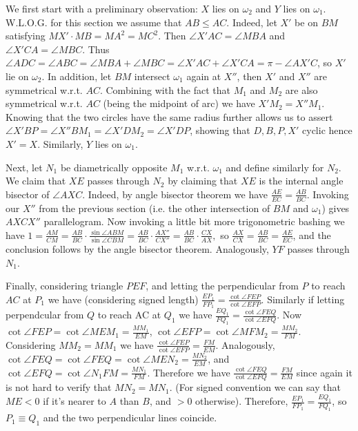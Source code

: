 \documentclass[11pt,a4paper]{article}
\begin{document}
\begin{itemize}
We first start with a preliminary observation: $X$ lies on $\omega_2$ and $Y$ lies on $\omega_1$. W.L.O.G. for this section we assume that $AB\le AC$. Indeed, let $X'$ be on $BM$ satisfying $MX'\cdot MB=MA^2=MC^2$. Then $\angle X'AC=\angle MBA$ and $\angle X'CA=\angle MBC$. Thus $\angle ADC=\angle ABC=\angle MBA+\angle MBC=\angle X'AC+\angle X'CA=\pi - \angle AX'C$, so $X'$ lie on $\omega_2$. In addition, let $BM$ intersect $\omega_1$ again at $X''$, then $X'$ and $X''$ are symmetrical w.r.t. $AC$. Combining with the fact that $M_1$ and $M_2$ are also symmetrical w.r.t. $AC$ (being the midpoint of arc) we have $X'M_2=X''M_1$. Knowing that the two circles have the same radius further allows us to assert $\angle X'BP=\angle X''BM_1=\angle X'DM_2=\angle X'DP$, showing that $D, B, P, X'$ cyclic hence $X'=X$. Similarly, $Y$ lies on $\omega_1$.

Next, let $N_1$ be diametrically opposite $M_1$ w.r.t. $\omega_1$ and define similarly for $N_2$. We claim that $XE$ passes through $N_2$ by claiming that $XE$ is the internal angle bisector of $\angle AXC$. Indeed, by angle bisector theorem we have $\frac{AE}{EC}=\frac{AB}{BC}$. Invoking our $X''$ from the previous section (i.e. the other intersection of $BM$ and $\omega_1$) gives $AXCX''$ parallelogram. Now invoking a little bit more trigonometric bashing we have $1=\frac{AM}{CM}=\frac{AB}{BC}\cdot\frac{\sin\angle ABM}{\sin\angle CBM}=\frac{AB}{BC}\cdot\frac{AX''}{CX''}=\frac{AB}{BC}\cdot\frac{CX}{AX},$ so $\frac{AX}{CX}=\frac{AB}{BC}=\frac{AE}{EC}$, and the conclusion follows by the angle bisector theorem. Analogously, $YF$ passes through $N_1$.

Finally, considering triangle $PEF$, and letting the perpendicular from $P$ to reach $AC$ at $P_1$ we have (considering signed length) $\frac{EP_1}{FP_1}=\frac{\cot\angle FEP}{\cot\angle EFP}$. Similarly if letting perpendcular from $Q$ to reach AC at $Q_1$ we have $\frac{EQ_1}{FQ_1}=\frac{\cot\angle FEQ}{\cot\angle EFQ}$. Now $\cot\angle FEP=\cot\angle MEM_1=\frac{MM_1}{EM}$, $\cot\angle EFP=\cot\angle MFM_2=\frac{MM_2}{FM}$. Considering $MM_2=MM_1$ we have $\frac{\cot\angle FEP}{\cot\angle EFP}=\frac{FM}{EM}$. Analogously, $\cot\angle FEQ=\cot\angle FEQ=\cot\angle MEN_2=\frac{MN_2}{EM}$, and $\cot\angle EFQ=\cot\angle N_1FM=\frac{MN_1}{FM}$. Therefore we have $\frac{\cot\angle FEQ}{\cot\angle EFQ}=\frac{FM}{EM}$ since again it is not hard to verify that $MN_2=MN_1$. (For signed convention we can say that $ME<0$ if it's nearer to $A$ than $B$, and $>0$ otherwise). Therefore, $\frac{EP_1}{FP_1}=\frac{EQ_1}{FQ_1}$, so $P_1\equiv Q_1$ and the two perpendicular lines coincide.


\end{itemize}
\end{document}
